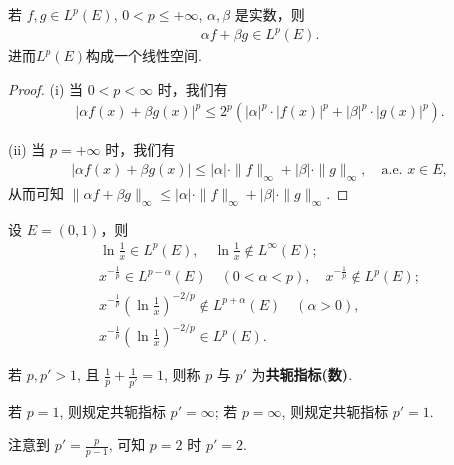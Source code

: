 \documentclass[../../main.tex]{subfiles}%
\begin{document}
\begin{theorem}
若 $f,g\in L^p(E)$, $0 < p \leqslant +\infty$, $\alpha,\beta$ 是实数，则
\begin{align*}
\alpha f + \beta g \in L^p(E).
\end{align*}
进而$L^p(E)$构成一个线性空间.
\end{theorem}
\begin{proof}

(i) 当 $0 < p < \infty$ 时，我们有
\begin{align*}
|\alpha f(x) + \beta g(x)|^p \leqslant 2^p(|\alpha|^p \cdot |f(x)|^p + |\beta|^p \cdot |g(x)|^p).
\end{align*}

(ii) 当 $p = +\infty$ 时，我们有
\begin{align*}
|\alpha f(x) + \beta g(x)| \leqslant |\alpha| \cdot \|f\|_\infty + |\beta| \cdot \|g\|_\infty,\quad \text{a.e. } x\in E,
\end{align*}
从而可知 $\|\alpha f + \beta g\|_\infty \leqslant |\alpha| \cdot \|f\|_\infty + |\beta| \cdot \|g\|_\infty$.

\end{proof}

\begin{example}
设 $E=(0,1)$，则
\begin{gather*}
\ln\frac{1}{x} \in L^p(E),\quad \ln\frac{1}{x} \notin L^\infty(E); \\
x^{-\frac{1}{p}} \in L^{p-\alpha}(E)\quad (0 < \alpha < p),\quad x^{-\frac{1}{p}} \notin L^p(E); \\
x^{-\frac{1}{p}}\left(\ln\frac{1}{x}\right)^{-2/p} \notin L^{p+\alpha}(E)\quad (\alpha > 0), \\
x^{-\frac{1}{p}}\left(\ln\frac{1}{x}\right)^{-2/p} \in L^p(E).
\end{gather*}
\end{example}

\begin{definition}[共轭指标]
若 $p,p'>1$, 且 $\frac{1}{p}+\frac{1}{p'}=1$, 则称 $p$ 与 $p'$ 为\textbf{共轭指标(数)}.

若 $p=1$, 则规定共轭指标 $p'=\infty$; 若 $p=\infty$, 则规定共轭指标 $p'=1$.
\end{definition}
\begin{remark}
注意到 $p'=\frac{p}{p-1}$, 可知 $p=2$ 时 $p'=2$.
\end{remark}
\end{document}
